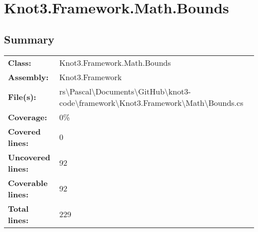 \documentclass[a4paper,10pt]{article}
\begin{document}
\section{Knot3.Framework.Math.Bounds}
\subsection{Summary}
\begin{longtable}[l]{ll}
\textbf{Class:} & Knot3.Framework.Math.Bounds\\
\textbf{Assembly:} & Knot3.Framework\\
\textbf{File(s):} & \begin{minipage}[t]{12cm}{rs\textbackslash Pascal\textbackslash Documents\textbackslash GitHub\textbackslash knot3-code\textbackslash framework\textbackslash Knot3.Framework\textbackslash Math\textbackslash Bounds.cs}\end{minipage} \\
\textbf{Coverage:} & 0\%\\
\textbf{Covered lines:} & 0\\
\textbf{Uncovered lines:} & 92\\
\textbf{Coverable lines:} & 92\\
\textbf{Total lines:} & 229\\
\end{longtable}
\end{document}
